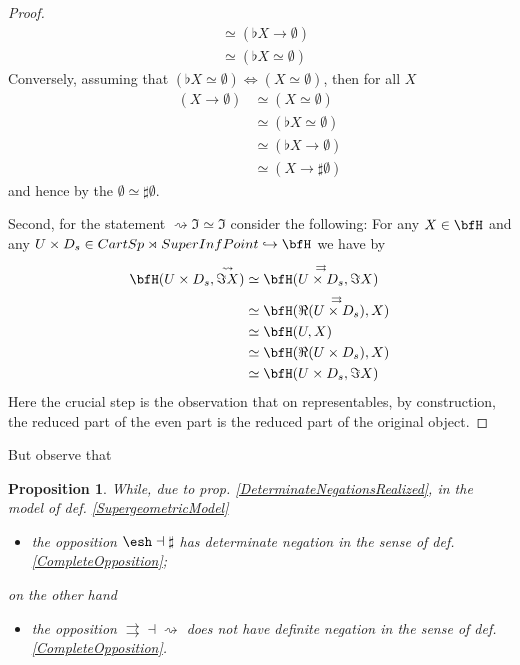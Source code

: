 \documentclass[12pt,titlepage]{article}
\theoremstyle{plain}
\newtheorem{prop}{Proposition}
\theoremstyle{definition}
\theoremstyle{remark}
\begin{document}
\begin{proof}
\begin{displaymath}
\begin{aligned}
& \simeq (\flat X \to \emptyset)
\\
& \simeq (\flat X \simeq \emptyset)
\end{aligned}
\end{displaymath}
Conversely, assuming that $(\flat X \simeq \emptyset) \Leftrightarrow (X \simeq \emptyset)$, then for all $X$
\begin{displaymath}
\begin{aligned}
(X\to \emptyset)
& \simeq
(X\simeq \emptyset)
\\
& \simeq (\flat X \simeq \emptyset)
\\
& \simeq (\flat X \to \emptyset)
\\
& \simeq (X\to \sharp \emptyset)
\end{aligned}
\end{displaymath}
and hence by the  $\emptyset \simeq \sharp \emptyset$.

Second, for the statement $\rightsquigarrow \Im \simeq \Im$ consider the following:
For any $X \in \bfH$ and any $U \times D_s\in CartSp \rtimes SuperInfPoint \hookrightarrow \bfH$ we have by  
\begin{displaymath}
\begin{aligned}
\bfH(U \times D_s , \stackrel{\rightsquigarrow}{\Im X})
& \simeq
\bfH(\stackrel{\rightrightarrows}{U \times D_s} , \Im X)
\\
&\simeq
\bfH(\Re(\stackrel{\rightrightarrows}{U \times D_s}) , X)
\\
& \simeq
\bfH(U, X)
\\
& \simeq
\bfH(\Re(U \times D_s), X)
\\
& \simeq \bfH(U \times D_s, \Im X)
\end{aligned}
\end{displaymath}
Here the crucial step is the observation that on representables, by construction, the reduced part of the even part is the reduced part of the original object.
\end{proof}
But observe that
\begin{prop}
\label{CompletenessOfOppositionsInSuperFormalSmoothTypes}\hypertarget{CompletenessOfOppositionsInSuperFormalSmoothTypes}{}
While, due to prop. \ref{DeterminateNegationsRealized}, in the model of def. \ref{SupergeometricModel}
\begin{itemize}%
\item the opposition $\esh  \dashv \sharp$ has determinate negation in the sense of def. \ref{CompleteOpposition};
\end{itemize}
on the other hand
\begin{itemize}%
\item the opposition $\rightrightarrows \dashv \rightsquigarrow$ does not have definite negation in the sense of def. \ref{CompleteOpposition}.
\end{itemize}
\end{prop}
\end{document}
